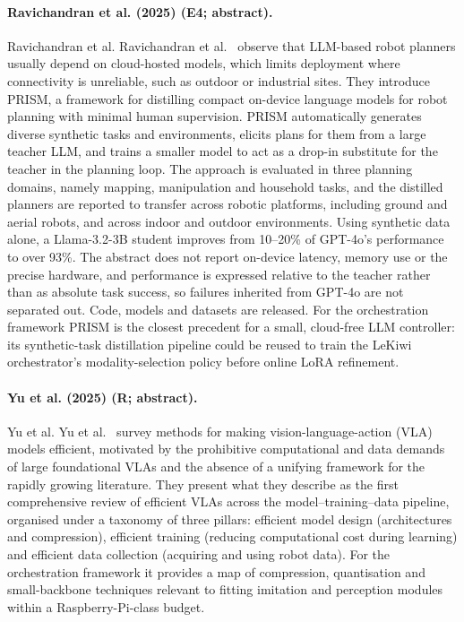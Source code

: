 \documentclass[10pt,a4paper]{article}
\begin{document}
\paragraph{Ravichandran et al. (2025) (E4; abstract).} Ravichandran et al. Ravichandran et al.~\cite{Ravichandran2025} observe that LLM-based robot planners usually depend on cloud-hosted models, which limits deployment where connectivity is unreliable, such as outdoor or industrial sites. They introduce PRISM, a framework for distilling compact on-device language models for robot planning with minimal human supervision. PRISM automatically generates diverse synthetic tasks and environments, elicits plans for them from a large teacher LLM, and trains a smaller model to act as a drop-in substitute for the teacher in the planning loop. The approach is evaluated in three planning domains, namely mapping, manipulation and household tasks, and the distilled planners are reported to transfer across robotic platforms, including ground and aerial robots, and across indoor and outdoor environments. Using synthetic data alone, a Llama-3.2-3B student improves from 10--20\% of GPT-4o's performance to over 93\%. The abstract does not report on-device latency, memory use or the precise hardware, and performance is expressed relative to the teacher rather than as absolute task success, so failures inherited from GPT-4o are not separated out. Code, models and datasets are released. For the orchestration framework PRISM is the closest precedent for a small, cloud-free LLM controller: its synthetic-task distillation pipeline could be reused to train the LeKiwi orchestrator's modality-selection policy before online LoRA refinement.

\paragraph{Yu et al. (2025) (R; abstract).} Yu et al. Yu et al.~\cite{Yu2025} survey methods for making vision-language-action (VLA) models efficient, motivated by the prohibitive computational and data demands of large foundational VLAs and the absence of a unifying framework for the rapidly growing literature. They present what they describe as the first comprehensive review of efficient VLAs across the model--training--data pipeline, organised under a taxonomy of three pillars: efficient model design (architectures and compression), efficient training (reducing computational cost during learning) and efficient data collection (acquiring and using robot data). For the orchestration framework it provides a map of compression, quantisation and small-backbone techniques relevant to fitting imitation and perception modules within a Raspberry-Pi-class budget.
\end{document}
